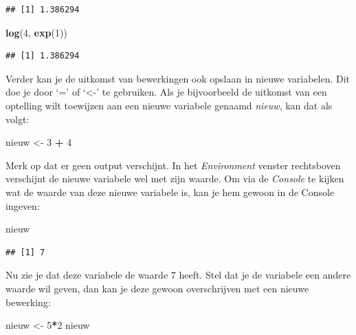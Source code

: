 \documentclass[
]{book}
\newenvironment{Shaded}{\begin{snugshade}}{\end{snugshade}}
\newcommand{\DecValTok}[1]{\textcolor[rgb]{0.00,0.00,0.81}{#1}}
\newcommand{\FunctionTok}[1]{\textcolor[rgb]{0.13,0.29,0.53}{\textbf{#1}}}
\newcommand{\NormalTok}[1]{#1}
\newcommand{\OtherTok}[1]{\textcolor[rgb]{0.56,0.35,0.01}{#1}}
\newcommand{\SpecialCharTok}[1]{\textcolor[rgb]{0.81,0.36,0.00}{\textbf{#1}}}
\begin{document}
\begin{verbatim}
## [1] 1.386294
\end{verbatim}

\begin{Shaded}
\begin{Highlighting}[]
\FunctionTok{log}\NormalTok{(}\DecValTok{4}\NormalTok{, }\FunctionTok{exp}\NormalTok{(}\DecValTok{1}\NormalTok{))}
\end{Highlighting}
\end{Shaded}

\begin{verbatim}
## [1] 1.386294
\end{verbatim}

Verder kan je de uitkomst van bewerkingen ook opslaan in nieuwe variabelen. Dit
doe je door `=' of `\textless-' te gebruiken. Als je bijvoorbeeld de uitkomst van een optelling
wilt toewijzen aan een nieuwe variabele genaamd \emph{nieuw}, kan dat als volgt:

\begin{Shaded}
\begin{Highlighting}[]
\NormalTok{nieuw }\OtherTok{\textless{}{-}} \DecValTok{3} \SpecialCharTok{+} \DecValTok{4}
\end{Highlighting}
\end{Shaded}

Merk op dat er geen output verschijnt. In het \emph{Environment} venster rechtsboven verschijnt de nieuwe variabele wel met zijn waarde. Om via de \emph{Console} te kijken wat de waarde van deze nieuwe variabele is, kan je hem gewoon in de Console ingeven:

\begin{Shaded}
\begin{Highlighting}[]
\NormalTok{nieuw}
\end{Highlighting}
\end{Shaded}

\begin{verbatim}
## [1] 7
\end{verbatim}

Nu zie je dat deze variabele de waarde 7 heeft. Stel dat je de variabele een andere waarde wil geven,
dan kan je deze gewoon overschrijven met een nieuwe bewerking:

\begin{Shaded}
\begin{Highlighting}[]
\NormalTok{nieuw }\OtherTok{\textless{}{-}} \DecValTok{5}\SpecialCharTok{*}\DecValTok{2}
\NormalTok{nieuw}
\end{Highlighting}
\end{Shaded}
\end{document}
